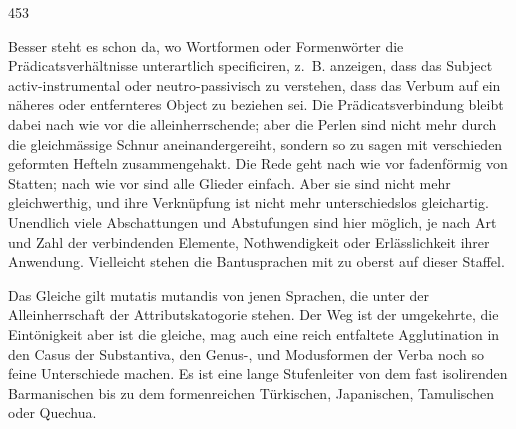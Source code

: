  {\textbar}{\textbar}453{\textbar}{\textbar}\label{sp.453} 

Besser steht es schon da, wo Wortformen oder Formenwörter die Prädicatsverhältnisse unterartlich specificiren, z.~B. anzeigen, dass das Subject activ-instru\-mental oder neutro-passivisch zu verstehen, dass das Verbum auf ein näheres oder entfernteres Object zu beziehen sei. Die Prädicatsverbindung bleibt dabei nach wie vor die alleinherrschende; aber die Perlen sind nicht mehr durch die gleichmässige Schnur aneinandergereiht, sondern so zu sagen mit verschieden geformten Hefteln zusammengehakt. Die Rede geht nach wie vor fadenförmig von Statten; nach wie vor sind alle Glieder einfach. Aber sie sind nicht mehr gleichwerthig, und ihre Verknüpfung ist nicht mehr unterschiedslos gleichartig. Unendlich viele Abschattungen und Abstufungen sind hier möglich, je nach Art und Zahl der verbindenden Elemente, Nothwendigkeit oder \label{fp.433} Erlässlichkeit ihrer Anwendung. Vielleicht stehen die Bantusprachen mit zu oberst auf dieser Staffel.

Das Gleiche gilt mutatis mutandis von jenen Sprachen, die unter der Alleinherrschaft der Attributskatogorie stehen. Der Weg ist der umgekehrte, die Eintönigkeit aber ist die gleiche, mag auch eine reich entfaltete Agglutination in den Casus der Substantiva, den Genus-,  und Modusformen der Verba noch so feine Unterschiede machen. Es ist eine lange Stufenleiter von dem fast isolirenden Barmanischen bis zu dem formenreichen Türkischen, Japanischen, Tamulischen oder Quechua.

